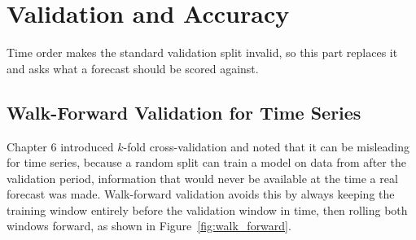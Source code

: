 \documentclass[../ai_in_finance]{subfiles}
\begin{document}
\section{Validation and Accuracy}

Time order makes the standard validation split invalid, so this part replaces it and asks what a forecast should be scored against.

\subsection{Walk-Forward Validation for Time Series}

Chapter 6 introduced $k$-fold cross-validation and noted that it can be misleading for time series, because a random split can train a model on data from after the validation period, information that would never be available at the time a real forecast was made. Walk-forward validation avoids this by always keeping the training window entirely before the validation window in time, then rolling both windows forward, as shown in Figure~\ref{fig:walk_forward}.

\begin{figure}[htbp]
\centering
\begin{lrbox}{\bookmeasuredbox}
\end{lrbox}
\ifdim\wd\bookmeasuredbox<0.65\linewidth
\setlength{\bookcapwidth}{0.65\linewidth}
\else
\setlength{\bookcapwidth}{\wd\bookmeasuredbox}
\fi
{}
\end{figure}
\end{document}
